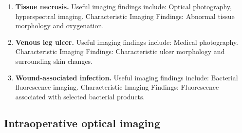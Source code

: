 \begin{enumerate}[leftmargin=*,itemsep=0.45em,topsep=0.4em]
\item \textbf{Tissue necrosis.} Useful imaging findings include: Optical photography, hyperspectral imaging. Characteristic Imaging Findings: Abnormal tissue morphology and oxygenation.
\item \textbf{Venous leg ulcer.} Useful imaging findings include: Medical photography. Characteristic Imaging Findings: Characteristic ulcer morphology and surrounding skin changes.
\item \textbf{Wound-associated infection.} Useful imaging findings include: Bacterial fluorescence imaging. Characteristic Imaging Findings: Fluorescence associated with selected bacterial products.
\end{enumerate}

\subsection{Intraoperative optical imaging}
